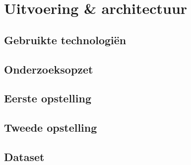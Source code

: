 \chapter{Uitvoering \& architectuur}
\section{Gebruikte technologi\"en}
\section{Onderzoeksopzet}
\section{Eerste opstelling}
\section{Tweede opstelling}
\section{Dataset}